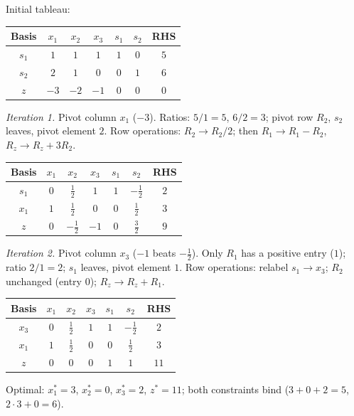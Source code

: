 \begin{solutions}
  \item Initial tableau:
        \begin{center}
        \begin{tabular}{c|ccccc|c}
        Basis & $x_1$ & $x_2$ & $x_3$ & $s_1$ & $s_2$ & RHS\\
        \hline
        $s_1$ & $1$ & $1$ & $1$ & $1$ & $0$ & $5$\\
        $s_2$ & $2$ & $1$ & $0$ & $0$ & $1$ & $6$\\
        \hline
        $z$ & $-3$ & $-2$ & $-1$ & $0$ & $0$ & $0$\\
        \end{tabular}
        \end{center}
        \emph{Iteration 1.} Pivot column $x_1$ ($-3$). Ratios: $5/1=5$,
        $6/2=3$; pivot row $R_2$, $s_2$ leaves, pivot element $2$. Row
        operations: $R_2\to R_2/2$; then $R_1\to R_1-R_2$,
        $R_z\to R_z+3R_2$.
        \begin{center}
        \begin{tabular}{c|ccccc|c}
        Basis & $x_1$ & $x_2$ & $x_3$ & $s_1$ & $s_2$ & RHS\\
        \hline
        $s_1$ & $0$ & $\tfrac{1}{2}$ & $1$ & $1$ & $-\tfrac{1}{2}$ & $2$\\
        $x_1$ & $1$ & $\tfrac{1}{2}$ & $0$ & $0$ & $\tfrac{1}{2}$ & $3$\\
        \hline
        $z$ & $0$ & $-\tfrac{1}{2}$ & $-1$ & $0$ & $\tfrac{3}{2}$ & $9$\\
        \end{tabular}
        \end{center}
        \emph{Iteration 2.} Pivot column $x_3$ ($-1$ beats
        $-\tfrac{1}{2}$). Only $R_1$ has a positive entry ($1$); ratio
        $2/1=2$; $s_1$ leaves, pivot element $1$. Row operations:
        relabel $s_1\to x_3$; $R_2$ unchanged (entry $0$);
        $R_z\to R_z+R_1$.
        \begin{center}
        \begin{tabular}{c|ccccc|c}
        Basis & $x_1$ & $x_2$ & $x_3$ & $s_1$ & $s_2$ & RHS\\
        \hline
        $x_3$ & $0$ & $\tfrac{1}{2}$ & $1$ & $1$ & $-\tfrac{1}{2}$ & $2$\\
        $x_1$ & $1$ & $\tfrac{1}{2}$ & $0$ & $0$ & $\tfrac{1}{2}$ & $3$\\
        \hline
        $z$ & $0$ & $0$ & $0$ & $1$ & $1$ & $11$\\
        \end{tabular}
        \end{center}
        Optimal: $x_1^{*}=3$, $x_2^{*}=0$, $x_3^{*}=2$, $z^{*}=11$;
        both constraints bind ($3+0+2=5$, $2\cdot 3+0=6$).


\end{solutions}
